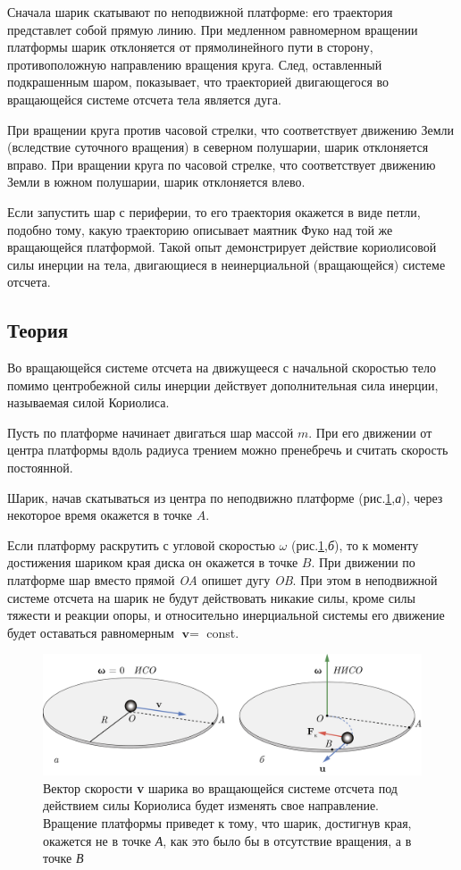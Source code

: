 \documentclass[All.tex]{subfiles}
\begin{document}
Сначала шарик скатывают по неподвижной платформе: его траектория представлет собой прямую линию.
При медленном равномерном вращении платформы шарик отклоняется от прямолинейного пути в сторону, противоположную направлению вращения круга.
След, оставленный подкрашенным шаром, показывает, что траекторией двигающегося во вращающейся системе отсчета тела является дуга.

При вращении круга против часовой стрелки, что соответствует движению Земли 
(вследствие суточного вращения) в северном полушарии, шарик отклоняется вправо.
При вращении круга по часовой стрелке, что соответствует движению Земли в южном полушарии, шарик отклоняется влево.

Если запустить шар с периферии, то его траектория окажется в виде петли, подобно тому, какую траекторию описывает маятник Фуко над той же вращающейся платформой.
Такой опыт демонстрирует действие кориолисовой силы инерции на тела, двигающиеся в неинерциальной (вращающейся) системе отсчета.

	\subsection*{\textcolor{PineGreen}{Теория}}
	
	Во вращающейся системе отсчета на движущееся с начальной скоростью тело помимо центробежной силы инерции действует дополнительная сила инерции, называемая силой Кориолиса.

	Пусть по платформе начинает двигаться шар массой $ m $.
При его движении от центра платформы вдоль радиуса трением можно пренебречь и считать скорость постоянной.
	
Шарик, начав скатываться из центра по неподвижно платформе (рис.\ref{Coriolis-3},\textit{а}), через некоторое время окажется в точке $ A $.

	
	Если платформу раскрутить с угловой скоростью $ \omega $ (рис.\ref{Coriolis-3},\textit{б}), то к моменту достижения шариком края диска он окажется в точке $ B $.
	При движении по платформе шар вместо прямой \textit{OA} опишет дугу \textit{OB}.
	При этом в неподвижной системе отсчета на шарик не будут действовать никакие силы, кроме силы тяжести и реакции опоры, и относительно инерциальной системы его движение будет оставаться равномерным  $ \textbf{v} = $ const.
	
		\begin{figure}[H] 	
		\centering 	
		\includegraphics[width=0.9\linewidth]{Coriolis-3.png}
		\caption{Вектор скорости \textbf{v} шарика во вращающейся системе отсчета под действием силы Кориолиса будет изменять свое направление. Вращение платформы приведет к тому, что шарик, достигнув края, окажется не в точке \textit{А}, как это было бы в отсутствие вращения, а в точке \textit{В}}
		\label{Coriolis-3}
	\end{figure}
\end{document}
